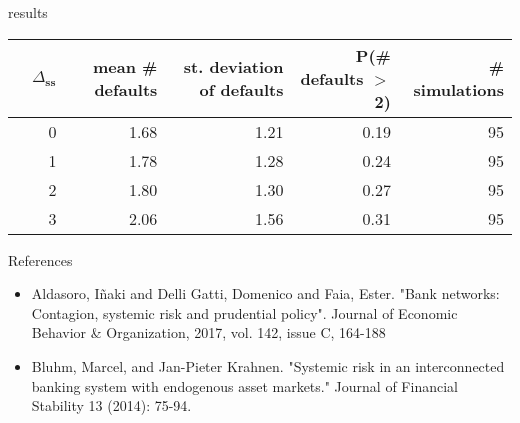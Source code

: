 \documentclass{beamer}
\begin{document}
\begin{frame}{results}
    
\begin{table}[ht]
    \centering
    \begin{tabular}{rrrrrr}
      \hline
     & $\Delta_{\textbf{ss}}$ & mean \# defaults & st. deviation of defaults & P(\# defaults $>$ 2) & \# simulations \\ 
      \hline
   & 0 & 1.68 & 1.21 & 0.19 &  95 \\ 
   & 1 & 1.78 & 1.28 & 0.24 &  95 \\ 
   & 2 & 1.80 & 1.30 & 0.27 &  95 \\ 
   & 3 & 2.06 & 1.56 & 0.31 &  95 \\ 
       \hline
    \end{tabular}
  \end{table}
  
\end{frame}


\begin{frame}{References}
    \begin{itemize}
        \item  Aldasoro, Iñaki and Delli Gatti, Domenico and Faia, Ester. "Bank networks: Contagion, systemic risk and prudential policy". Journal of Economic Behavior \& Organization, 2017, vol. 142, issue C, 164-188
        \item Bluhm, Marcel, and Jan-Pieter Krahnen. "Systemic risk in an interconnected banking system with endogenous asset markets." Journal of Financial Stability 13 (2014): 75-94.
    \end{itemize}

\end{frame}
    
\end{document}
